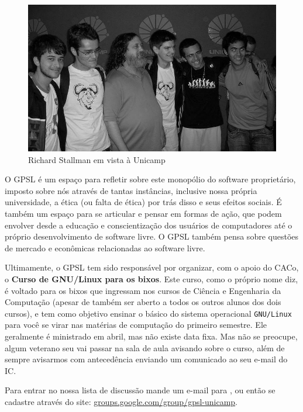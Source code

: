 \begin{figure}[h!]
    \centering
    \includegraphics[scale=0.36, keepaspectratio=true]{img/imgs/18-grupos_entidades/stallman2.JPG}
    \caption{Richard Stallman em vista à Unicamp}
\end{figure}

O GPSL é um espaço para refletir sobre este monopólio do software proprietário,
imposto sobre nós através de tantas instâncias, inclusive nossa própria
universidade, a ética (ou falta de ética) por trás disso e seus efeitos sociais.
É também um espaço para se articular e pensar em formas de ação, que podem
envolver desde a educação e conscientização dos usuários de computadores até
o próprio desenvolvimento de software livre. O GPSL também pensa sobre
questões de mercado e econômicas relacionadas ao software livre.

Ultimamente, o GPSL tem sido responsável por organizar, com o apoio do
CACo, o \textbf{Curso de GNU/Linux para os bixos}. Este curso, como o
próprio nome diz, é voltado para os bixos que ingressam nos cursos de
Ciência e Engenharia da Computação (apesar de também ser aberto a todos
os outros alunos dos dois cursos), e tem como objetivo ensinar o
básico do sistema operacional \texttt{GNU/Linux} para você se virar
nas matérias de computação do primeiro semestre. Ele geralmente é
ministrado em abril, mas não existe data fixa. Mas não se preocupe,
algum veterano seu vai passar na sala de aula avisando sobre o curso,
além de sempre avisarmos com antecedência enviando um comunicado ao
seu e-mail do IC.

Para entrar no nossa lista de discussão mande um e-mail para
, ou então se cadastre através do site:
\url{groups.google.com/group/gpsl-unicamp}.

